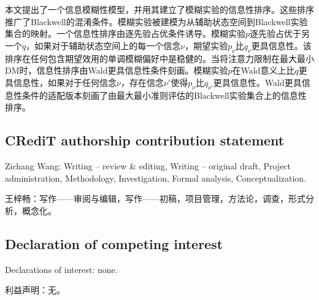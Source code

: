 \documentclass[12pt,a4paper]{article}
\newenvironment{original}
  {\par\vspace{4pt}\noindent\color{black}\ignorespaces}
  {\par\vspace{2pt}}
\newenvironment{translation}
  {\par\vspace{2pt}\noindent\color{myblue}\ignorespaces}
  {\par\vspace{6pt}}
\begin{document}
\begin{translation}
本文提出了一个信息模糊性模型，并用其建立了模糊实验的信息性排序。这些排序推广了Blackwell的混淆条件。模糊实验被建模为从辅助状态空间到Blackwell实验集合的映射。一个信息性排序由逐先验占优条件诱导。模糊实验$p$逐先验占优于另一个$q$，如果对于辅助状态空间上的每一个信念$\nu$，期望实验$p_{\nu}$比$q_{\nu}$更具信息性。该排序在任何包含期望效用的单调模糊偏好中是稳健的。当将注意力限制在最大最小DM时，信息性排序由Wald更具信息性条件刻画。模糊实验$p$在Wald意义上比$q$更具信息性，如果对于任何信念$\nu$，存在信念$\nu'$使得$p_{\nu}$比$q_{\nu'}$更具信息性。Wald更具信息性条件的适配版本刻画了由最大最小准则评估的Blackwell实验集合上的信息性排序。
\end{translation}


\subsection*{CRediT authorship contribution statement}
\begin{original}
Zichang Wang: Writing -- review \& editing, Writing -- original draft, Project administration, Methodology, Investigation, Formal analysis, Conceptualization.
\end{original}

\begin{translation}
王梓畅：写作——审阅与编辑，写作——初稿，项目管理，方法论，调查，形式分析，概念化。
\end{translation}


\subsection*{Declaration of competing interest}
\begin{original}
Declarations of interest: none.
\end{original}

\begin{translation}
利益声明：无。
\end{translation}

\end{document}
